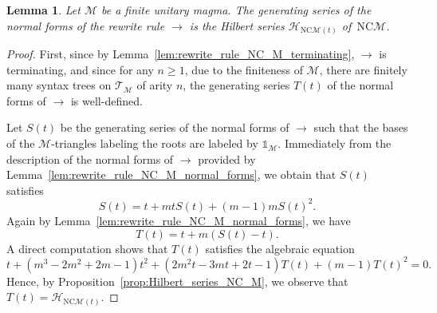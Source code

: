 \documentclass[10pt,reqno]{amsart}
\numberwithin{equation}{subsection}
\renewcommand{\geq}{\geqslant}
\newtheorem{Lemma}[Theorem]{Lemma}
\newcommand{\Mca}{\mathcal{M}}
\newcommand{\NC}{\mathrm{NC}}
\newcommand{\Unit}{\mathds{1}}
\newcommand{\Hilbert}{\mathcal{H}}
\newcommand{\Rew}{\to}
\newcommand{\Triangles}{\mathcal{T}}
\begin{document}
\begin{Lemma} \label{lem:generating_series_normal_forms_rewrite_rule_NC_M}
    Let $\Mca$ be a finite unitary magma. The generating series of the
    normal forms of the rewrite rule $\Rew$ is the Hilbert series
    $\Hilbert_{\NC\Mca(t)}$ of~$\NC\Mca$.
\end{Lemma}
\begin{proof}
    First, since by Lemma~\ref{lem:rewrite_rule_NC_M_terminating},
    $\Rew$ is terminating, and since for any $n \geq 1$, due to the
    finiteness of $\Mca$, there are finitely many syntax trees on
    $\Triangles_\Mca$ of arity $n$, the generating series $T(t)$ of the
    normal forms of $\Rew$ is well-defined.
    \smallskip

    Let $S(t)$ be the generating series of the normal forms of $\Rew$
    such that the bases of the $\Mca$-triangles labeling the roots are
    labeled by $\Unit_\Mca$. Immediately from the description of the
    normal forms of $\Rew$ provided by
    Lemma~\ref{lem:rewrite_rule_NC_M_normal_forms}, we obtain that
    $S(t)$ satisfies
    \begin{equation}
        S(t) = t + mtS(t) + (m - 1)m S(t)^2.
    \end{equation}
    Again by
    Lemma~\ref{lem:rewrite_rule_NC_M_normal_forms}, we have
    \begin{equation}
        T(t) = t + m(S(t) - t).
    \end{equation}
    A direct computation shows that $T(t)$ satisfies the algebraic
    equation
    \begin{equation}
        t + \left(m^3 - 2m^2 + 2m - 1\right)t^2
        + \left(2m^2t - 3mt + 2t - 1\right) T(t)
        + \left(m - 1\right) T(t)^2
        = 0.
    \end{equation}
    Hence, by Proposition~\ref{prop:Hilbert_series_NC_M}, we observe
    that $T(t) = \Hilbert_{\NC\Mca(t)}$.
\end{proof}
\medskip
\end{document}
